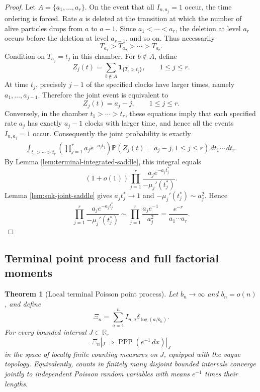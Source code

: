 \documentclass[11pt]{article}
\newtheorem{theorem}{Theorem}[section]
\theoremstyle{remark}
\newcommand{\Pp}{\mathbb P}
\newcommand{\one}{\mathbf 1}
\newcommand{\PPP}{\operatorname{PPP}}
\newcommand{\dd}{\,d}
\begin{document}
\begin{proof}
Let \(A=\{a_1,\ldots,a_r\}\).  On the event that all \(I_{n,a_j}=1\) occur, the time ordering is forced.  Rate \(a\) is deleted at the transition at which the number of alive particles drops from \(a\) to \(a-1\).  Since \(a_1<\cdots<a_r\), the deletion at level \(a_r\) occurs before the deletion at level \(a_{r-1}\), and so on.  Thus necessarily
\[
        T_{a_1}>T_{a_2}>\cdots>T_{a_r}.
\]
Condition on \(T_{a_j}=t_j\) in this chamber.  For \(b\notin A\), define
\[
        Z_j(t)=\sum_{b\notin A}\one_{\{T_b>t_j\}},
        \qquad 1\le j\le r.
\]
At time \(t_j\), precisely \(j-1\) of the specified clocks have larger times, namely \(a_1,\ldots,a_{j-1}\).  Therefore the joint event is equivalent to
\[
        Z_j(t)=a_j-j,
        \qquad 1\le j\le r.
\]
Conversely, in the chamber \(t_1>\cdots>t_r\), these equations imply that each specified rate \(a_j\) has exactly \(a_j-1\) clocks with larger time, and hence all the events \(I_{n,a_j}=1\) occur.  Consequently the joint probability is exactly
\[
\begin{aligned}
\int_{t_1>\cdots>t_r}
        \left(\prod_{j=1}^r a_j e^{-a_j t_j}\right)
        \Pp(Z_j(t)=a_j-j,
        1\le j\le r)
        \dd t_1\cdots\dd t_r .
\end{aligned}
\]
By Lemma \ref{lem:terminal-integrated-saddle}, this integral equals
\[
        (1+o(1))
        \prod_{j=1}^r
        \frac{a_j e^{-a_jt_j^*}}{-\mu_j'(t_j^*)}.
\]
Lemma \ref{lem:suk-joint-saddle} gives \(a_jt_j^*\to1\) and \(-\mu_j'(t_j^*)\sim a_j^2\).  Hence
\[
        \prod_{j=1}^r
        \frac{a_j e^{-a_jt_j^*}}{-\mu_j'(t_j^*)}
        \sim
        \prod_{j=1}^r\frac{a_je^{-1}}{a_j^2}
        =\frac{e^{-r}}{a_1\cdots a_r}.
\]
\end{proof}

\subsection{Terminal point process and full factorial moments}

\begin{theorem}[Local terminal Poisson point process]\label{thm:suk-ppp}
Let \(b_n\to\infty\) and \(b_n=o(n)\), and define
\[
        \Xi_n=\sum_{a=1}^n I_{n,a}\delta_{\log(a/b_n)}.
\]
For every bounded interval \(J\subset\mathbb R\),
\[
        \Xi_n|_J\Rightarrow \PPP(e^{-1}\dd x)|_J
\]
in the space of locally finite counting measures on \(J\), equipped with the
vague topology.  Equivalently, counts in finitely many disjoint bounded
intervals converge jointly to independent Poisson random variables with means
\(e^{-1}\) times their lengths.
\end{theorem}
\end{document}
